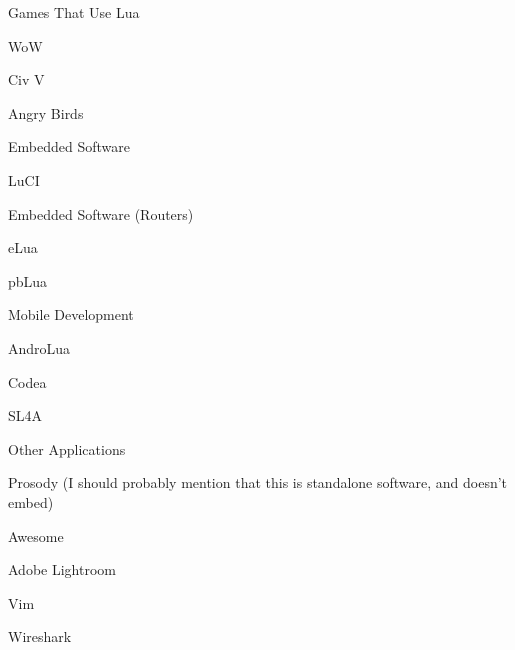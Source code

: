 \begin{itemslide}{Games That Use Lua}
\item WoW
\item Civ V
\item Angry Birds
\end{itemslide}

\begin{itemslide}{Embedded Software}
\item LuCI
\item Embedded Software (Routers)
\item eLua
\item pbLua
\end{itemslide}

\begin{itemslide}{Mobile Development}
\item AndroLua
\item Codea
\item SL4A
\end{itemslide}

\begin{itemslide}{Other Applications}
\item Prosody (I should probably mention that this is standalone software, and doesn't embed)
\item Awesome
\item Adobe Lightroom
\item Vim
\item Wireshark
\end{itemslide}


